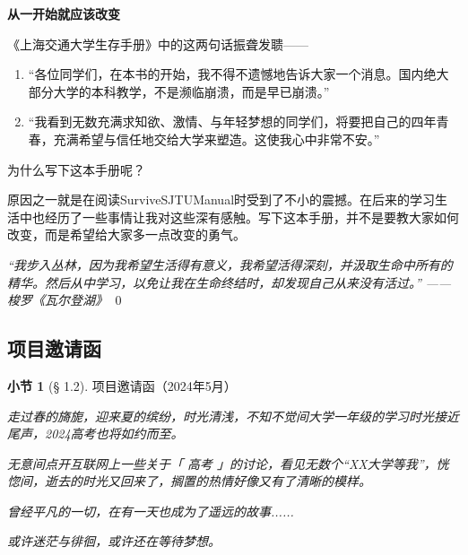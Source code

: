\documentclass{beamer}	%
\theoremstyle{plain}
\theoremstyle{definition}
\newtheorem{dfn}{小节}[section]
\theoremstyle{remark}
\numberwithin{equation}{section}
\begin{document}
\begin{frame}
	\begin{LARGE}
		\textbf{从一开始就应该改变}
	\end{LARGE}
	\vspace{1cm}

	《上海交通大学生存手册》中的这两句话振聋发聩——
	\vspace{0.5cm}

	\begin{enumerate}
		\item “各位同学们，在本书的开始，我不得不遗憾地告诉大家一个消息。国内绝大部分大学的本科教学，不是濒临崩溃，而是早已崩溃。”
		\item “我看到无数充满求知欲、激情、与年轻梦想的同学们，将要把自己的四年青春，充满希望与信任地交给大学来塑造。这使我心中非常不安。”
	\end{enumerate}
	
\end{frame}

\begin{frame}
	为什么写下这本手册呢？
	\vspace{0.5cm}
	
	原因之一就是在阅读SurviveSJTUManual时受到了不小的震撼。在后来的学习生活中也经历了一些事情让我对这些深有感触。写下这本手册，并不是要教大家如何改变，而是希望给大家多一点改变的勇气。
	\vspace{1cm}

	\textit{“我步入丛林，因为我希望生活得有意义，我希望活得深刻，并汲取生命中所有的精华。然后从中学习，以免让我在生命终结时，却发现自己从来没有活过。”}
	\vspace{0.5cm}
	\textit{——梭罗《瓦尔登湖》}
	\qed
\end{frame}


\subsection{项目邀请函}

\begin{frame}
	\begin{dfn}[§ 1.2]
		项目邀请函（2024年5月）
	\end{dfn}

\end{frame}

\begin{frame}
	\textit{走过春的旖旎，迎来夏的缤纷，时光清浅，不知不觉间大学一年级的学习时光接近尾声，2024高考也将如约而至。}
	\vspace{0.5cm}
	
	\textit{无意间点开互联网上一些关于「 高考 」的讨论，看见无数个“XX大学等我”，恍惚间，逝去的时光又回来了，搁置的热情好像又有了清晰的模样。}
	\vspace{0.5cm}

	\textit{曾经平凡的一切，在有一天也成为了遥远的故事......}
	\vspace{0.5cm}

	\textit{或许迷茫与徘徊，或许还在等待梦想。}
\end{frame}
\end{document}
